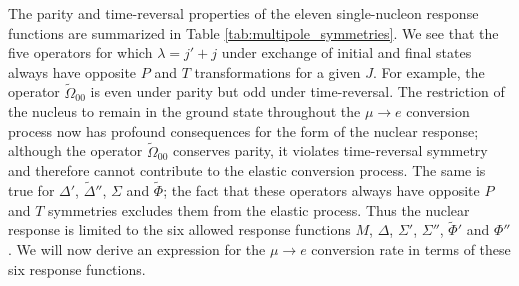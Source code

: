 \documentclass{book}[letterpaper,12pt]
\begin{document}
The parity and time-reversal properties of the eleven single-nucleon response functions are summarized in Table \ref{tab:multipole_symmetries}. We see that the five operators for which $\lambda=j'+j$ under exchange of initial and final states always have opposite $P$ and $T$ transformations for a given $J$. For example, the operator $\tilde{\Omega}_{00}$ is even under parity but odd under time-reversal. The restriction of the nucleus to remain in the ground state throughout the $\mu\rightarrow e$ conversion process now has profound consequences for the form of the nuclear response; although the operator $\tilde{\Omega}_{00}$ conserves parity, it violates time-reversal symmetry and therefore cannot contribute to the elastic conversion process. The same is true for $\Delta'$, $\tilde{\Delta}''$, $\Sigma$ and $\tilde{\Phi}$; the fact that these operators always have opposite $P$ and $T$ symmetries excludes them from the elastic process. Thus the nuclear response is limited to the six allowed response functions $M$, $\Delta$, $\Sigma'$, $\Sigma''$, $\tilde{\Phi}'$ and $\Phi''$. We will now derive an expression for the $\mu\rightarrow e$ conversion rate in terms of these six response functions.
\end{document}
